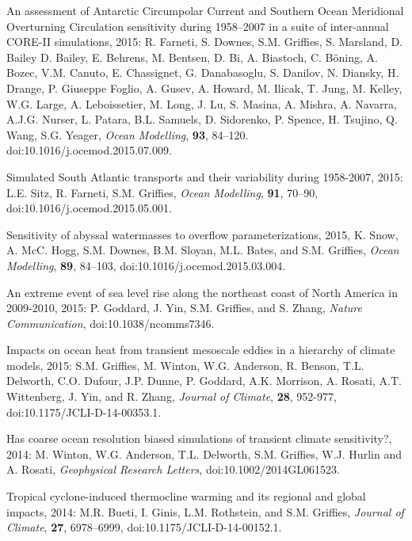 \begin{etaremune}
\item An assessment of Antarctic Circumpolar Current and Southern
  Ocean Meridional Overturning Circulation sensitivity during
  1958--2007 in a suite of inter-annual CORE-II simulations, 2015:
  R. Farneti, S. Downes, S.M. Grif\/f\/ies, S. Marsland,
  D. Bailey D. Bailey, E. Behrens, M. Bentsen, D. Bi, A. Biastoch,
  C. B\"oning, A. Bozec, V.M. Canuto, E. Chassignet, G. Danabasoglu,
  S. Danilov, N. Diansky, H. Drange, P. Giuseppe Foglio, A. Gusev,
  A. Howard, M. Ilicak, T.  Jung, M. Kelley, W.G. Large,
  A. Leboissetier, M. Long, J. Lu, S. Masina, A. Mishra, A. Navarra,
  A.J.G. Nurser, L. Patara, B.L. Samuels, D. Sidorenko, P. Spence,
  H. Tsujino, Q. Wang, S.G. Yeager, {\it Ocean Modelling}, {\bf 93},
  84--120. doi:10.1016/j.ocemod.2015.07.009.

\item Simulated South Atlantic transports and their variability during 1958-2007, 2015: L.E.  Sitz, R. Farneti, S.M. Grif\/f\/ies,
{\it Ocean Modelling}, {\bf 91}, 70--90, doi:10.1016/j.ocemod.2015.05.001.

\item Sensitivity of abyssal watermasses to overflow
parameterizations, 2015, K. Snow, A. McC. Hogg, S.M. Downes,  B.M. Sloyan, M.L. Bates, and S.M. Grif\/f\/ies, {\it Ocean Modelling}, {\bf 89}, 84--103, doi:10.1016/j.ocemod.2015.03.004.

\item An extreme event of sea level rise along the northeast coast of North America in 2009-2010, 2015: P.  Goddard, J. Yin, S.M. Grif\/f\/ies, and S. Zhang, {\it Nature Communication}, doi:10.1038/ncomms7346.

\item Impacts on ocean heat from transient mesoscale eddies in a hierarchy of climate models, 2015: S.M. Grif\/f\/ies, M. Winton, W.G. Anderson, R. Benson, T.L. Delworth, C.O. Dufour, J.P. Dunne, P. Goddard, A.K. Morrison, A. Rosati, A.T. Wittenberg, J. Yin, and R. Zhang, {\it Journal of Climate}, {\bf 28}, 952-977, doi:10.1175/JCLI-D-14-00353.1.

\item Has coarse ocean resolution biased simulations of transient climate sensitivity?, 2014: M.  Winton, W.G. Anderson, T.L. Delworth, S.M. Grif\/f\/ies, W.J. Hurlin and A. Rosati, {\it Geophysical Research Letters}, doi:10.1002/2014GL061523.

\item Tropical cyclone-induced thermocline warming and its regional
  and global impacts, 2014: M.R. Bueti, I. Ginis, L.M. Rothstein, and
  S.M. Grif\/f\/ies, {\it Journal of Climate}, {\bf 27},
  6978--6999, doi:10.1175/JCLI-D-14-00152.1.


\end{etaremune}
